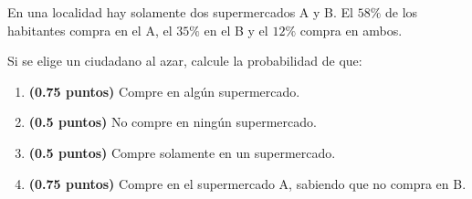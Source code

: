 
En una localidad hay solamente dos supermercados A y B. El $58\%$ de los habitantes compra en el A, el $35\%$ en el B y el $12\%$ compra en ambos.

Si se elige un ciudadano al azar, calcule la probabilidad de que:
\begin{enumerate}[label=\alph*)]
\item \textbf{(0.75 puntos)} Compre en algún supermercado.
\item \textbf{(0.5 puntos)} No compre en ningún supermercado.
\item \textbf{(0.5 puntos)} Compre solamente en un supermercado.
\item \textbf{(0.75 puntos)} Compre en el supermercado A, sabiendo que no compra en B.
\end{enumerate}
